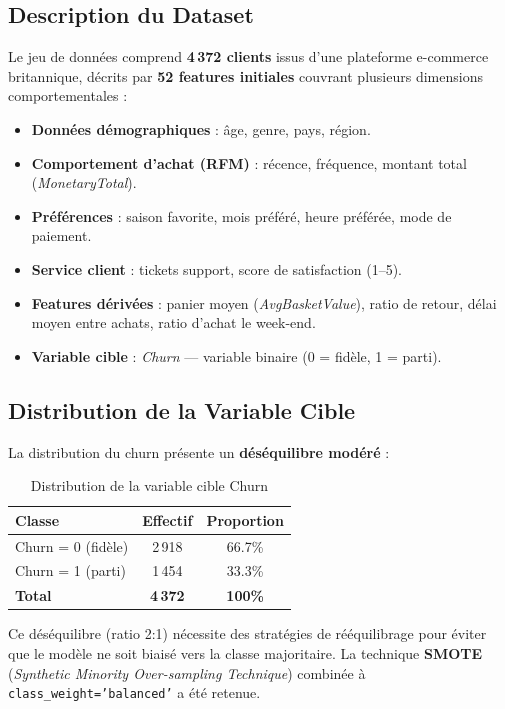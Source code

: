 \documentclass[12pt,a4paper]{article}
\begin{document}
\subsection{Description du Dataset}

Le jeu de données comprend \textbf{4\,372 clients} issus d'une plateforme e-commerce britannique,
décrits par \textbf{52 features initiales} couvrant plusieurs dimensions comportementales :

\begin{itemize}
  \item \textbf{Données démographiques} : âge, genre, pays, région.
  \item \textbf{Comportement d'achat (RFM)} : récence, fréquence, montant total (\textit{MonetaryTotal}).
  \item \textbf{Préférences} : saison favorite, mois préféré, heure préférée, mode de paiement.
  \item \textbf{Service client} : tickets support, score de satisfaction (1--5).
  \item \textbf{Features dérivées} : panier moyen (\textit{AvgBasketValue}), ratio de retour,
        délai moyen entre achats, ratio d'achat le week-end.
  \item \textbf{Variable cible} : \textit{Churn} — variable binaire (0 = fidèle, 1 = parti).
\end{itemize}

\subsection{Distribution de la Variable Cible}

La distribution du churn présente un \textbf{déséquilibre modéré} :

\begin{table}[H]
\centering
\caption{Distribution de la variable cible Churn}
\begin{tabular}{lcc}
\toprule
\textbf{Classe} & \textbf{Effectif} & \textbf{Proportion} \\
\midrule
Churn = 0 (fidèle) & 2\,918 & 66.7\% \\
Churn = 1 (parti)  & 1\,454 & 33.3\% \\
\midrule
\textbf{Total}     & \textbf{4\,372} & \textbf{100\%} \\
\bottomrule
\end{tabular}
\end{table}

Ce déséquilibre (ratio 2:1) nécessite des stratégies de rééquilibrage pour éviter que le modèle
ne soit biaisé vers la classe majoritaire. La technique \textbf{SMOTE} (\textit{Synthetic Minority
Over-sampling Technique}) combinée à \texttt{class\_weight='balanced'} a été retenue.
\end{document}
